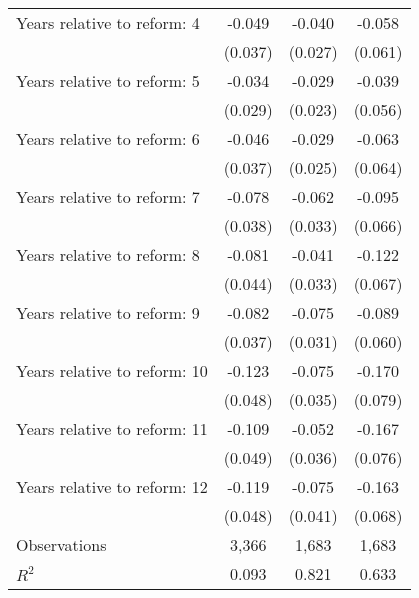 \begin{tabular}{@{}l*{3}{c}}
Years relative to reform: 4&      -0.049         &      -0.040         &      -0.058         \\
                    &     (0.037)         &     (0.027)         &     (0.061)         \\
Years relative to reform: 5&      -0.034         &      -0.029         &      -0.039         \\
                    &     (0.029)         &     (0.023)         &     (0.056)         \\
Years relative to reform: 6&      -0.046         &      -0.029         &      -0.063         \\
                    &     (0.037)         &     (0.025)         &     (0.064)         \\
Years relative to reform: 7&      -0.078\sym{**} &      -0.062\sym{*}  &      -0.095         \\
                    &     (0.038)         &     (0.033)         &     (0.066)         \\
Years relative to reform: 8&      -0.081\sym{*}  &      -0.041         &      -0.122\sym{*}  \\
                    &     (0.044)         &     (0.033)         &     (0.067)         \\
Years relative to reform: 9&      -0.082\sym{**} &      -0.075\sym{**} &      -0.089         \\
                    &     (0.037)         &     (0.031)         &     (0.060)         \\
Years relative to reform: 10&      -0.123\sym{**} &      -0.075\sym{**} &      -0.170\sym{**} \\
                    &     (0.048)         &     (0.035)         &     (0.079)         \\
Years relative to reform: 11&      -0.109\sym{**} &      -0.052         &      -0.167\sym{**} \\
                    &     (0.049)         &     (0.036)         &     (0.076)         \\
Years relative to reform: 12&      -0.119\sym{**} &      -0.075\sym{*}  &      -0.163\sym{**} \\
                    &     (0.048)         &     (0.041)         &     (0.068)         \\
Observations        &       3,366         &       1,683         &       1,683         \\
\(R^2\)             &       0.093         &       0.821         &       0.633         \\
\bottomrule \bottomrule \end{tabular}

